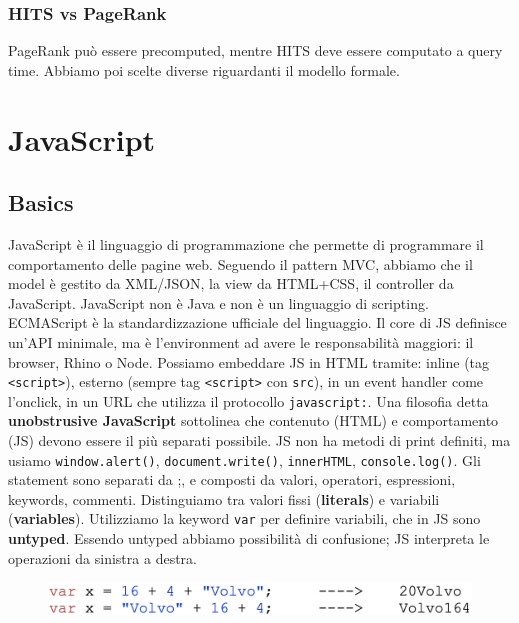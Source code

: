\documentclass[11pt]{article}
\newcommand{\code}[1]{\texttt{#1}}
\begin{document}
\subsubsection{HITS vs PageRank}
PageRank può essere precomputed, mentre HITS deve essere computato a query time. Abbiamo poi scelte diverse riguardanti il modello formale.

\section{JavaScript}
\subsection{Basics}
JavaScript è il linguaggio di programmazione che permette di programmare il comportamento delle pagine web. Seguendo il pattern MVC, abbiamo che il model è gestito da XML/JSON, la view da HTML+CSS, il controller da JavaScript. JavaScript non è Java e non è un linguaggio di scripting. ECMAScript è la standardizzazione ufficiale del linguaggio. Il core di JS definisce un'API minimale, ma è l'environment ad avere le responsabilità maggiori: il browser, Rhino o Node. 
Possiamo embeddare JS in HTML tramite: inline (tag \code{<script>}), esterno (sempre tag \code{<script>} con \code{src}), in un event handler come l'onclick, in un URL che utilizza il protocollo \code{javascript:}. Una filosofia detta \textbf{unobstrusive JavaScript} sottolinea che contenuto (HTML) e comportamento (JS) devono essere il più separati possibile. JS non ha metodi di print definiti, ma usiamo \code{window.alert()}, \code{document.write()}, \code{innerHTML}, \code{console.log()}. Gli statement sono separati da ;, e composti da valori, operatori, espressioni, keywords, commenti. Distinguiamo tra valori fissi (\textbf{literals}) e variabili (\textbf{variables}). Utilizziamo la keyword \code{var} per definire variabili, che in JS sono \textbf{untyped}. Essendo untyped abbiamo possibilità di confusione; JS interpreta le operazioni da sinistra a destra. 
\begin{figure}[H]
    \centering
    \includegraphics[width=0.4\linewidth]{res/JSconfusion.png}
\end{figure}
\end{document}
